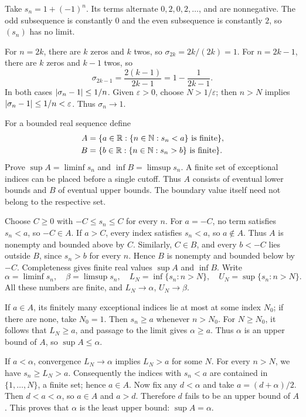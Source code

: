 Take $s_n=1+(-1)^n$. Its terms alternate $0,2,0,2,\ldots$, and
are nonnegative. The odd subsequence is constantly $0$ and the even
subsequence is constantly $2$, so $(s_n)$ has no limit.

For $n=2k$, there are $k$ zeros and $k$ twos, so
$\sigma_{2k}=2k/(2k)=1$. For $n=2k-1$, there are $k$ zeros and
$k-1$ twos, so
\[
 \sigma_{2k-1}=\frac{2(k-1)}{2k-1}
 =1-\frac{1}{2k-1}.
\]
In both cases $\left|\sigma_n-1\right|\le1/n$. Given $\varepsilon>0$,
choose $N>1/\varepsilon$; then $n>N$ implies
$\left|\sigma_n-1\right|\le1/n<\varepsilon$. Thus $\sigma_n\to1$.

\goal For a bounded real sequence define
\[
 \begin{split}
 A&=\{a\in\mathbb{R}:\{n\in\mathbb{N}:s_n<a\}\text{ is finite}\},\\
 B&=\{b\in\mathbb{R}:\{n\in\mathbb{N}:s_n>b\}\text{ is finite}\}.
 \end{split}
\]
Prove $\sup A=\liminf s_n$ and $\inf B=\limsup s_n$.
\idea A finite set of exceptional indices can be placed before a
single cutoff. Thus $A$ consists of eventual lower bounds and $B$
of eventual upper bounds. The boundary value itself need not belong
to the respective set.

Choose $C\ge0$ with $-C\le s_n\le C$ for every $n$.
For $a=-C$, no term satisfies $s_n<a$, so $-C\in A$.
If $a>C$, every index satisfies $s_n<a$, so $a\notin A$.
Thus $A$ is nonempty and bounded above by $C$.
Similarly, $C\in B$, and every $b<-C$ lies outside $B$, since
$s_n>b$ for every $n$. Hence $B$ is nonempty and bounded below
by $-C$. Completeness gives finite real values $\sup A$ and $\inf B$.
Write
\[
 \alpha=\liminf s_n,\quad\beta=\limsup s_n,\quad
 L_N=\inf\{s_n:n>N\},\quad U_N=\sup\{s_n:n>N\}.
\]
All these numbers are finite, and $L_N\to\alpha$, $U_N\to\beta$.

If $a\in A$, its finitely many exceptional indices lie at most at
some index $N_0$; if there are none, take $N_0=1$.
Then $s_n\ge a$ whenever $n>N_0$. For $N\ge N_0$, it follows
that $L_N\ge a$, and passage to the limit gives $\alpha\ge a$.
Thus $\alpha$ is an upper bound of $A$, so $\sup A\le\alpha$.

If $a<\alpha$, convergence $L_N\to\alpha$ implies $L_N>a$
for some $N$. For every $n>N$, we have $s_n\ge L_N>a$.
Consequently the indices with $s_n<a$ are contained in
$\{1,\ldots,N\}$, a finite set; hence $a\in A$.
Now fix any $d<\alpha$ and take $a=(d+\alpha)/2$.
Then $d<a<\alpha$, so $a\in A$ and $a>d$. Therefore $d$ fails
to be an upper bound of $A$. This proves that $\alpha$ is the
least upper bound: $\sup A=\alpha$.

